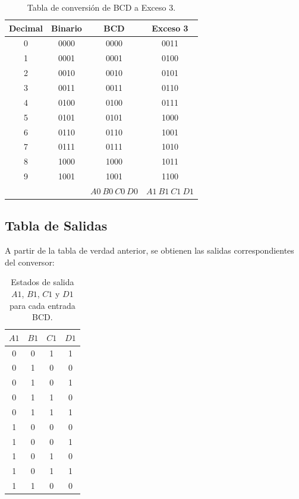 \documentclass[a4paper,12pt]{article}
\begin{document}
	\begin{table}[H]
		\centering
		\begin{tabular}{|c|c|c|c|}
			\hline
			\textbf{Decimal} & \textbf{Binario} & \textbf{BCD} & \textbf{Exceso 3} \\
			\hline
			0 & 0000 & 0000 & 0011 \\
			1 & 0001 & 0001 & 0100 \\
			2 & 0010 & 0010 & 0101 \\
			3 & 0011 & 0011 & 0110 \\
			4 & 0100 & 0100 & 0111 \\
			5 & 0101 & 0101 & 1000 \\
			6 & 0110 & 0110 & 1001 \\
			7 & 0111 & 0111 & 1010 \\
			8 & 1000 & 1000 & 1011 \\
			9 & 1001 & 1001 & 1100 \\
			\hline
			\multicolumn{2}{|c|}{} & $A0\ B0\ C0\ D0$ & $A1\ B1\ C1\ D1$ \\
			\hline
		\end{tabular}
		\caption{Tabla de conversión de BCD a Exceso 3.}
		\label{tab:bcd_exceso3}
	\end{table}
	
	\subsection{Tabla de Salidas}
	
	A partir de la tabla de verdad anterior, se obtienen las salidas correspondientes del conversor:
	
	\begin{table}[h]
		\centering
		\begin{tabular}{|c|c|c|c|}
			\hline
			\textbf{$A1$} & \textbf{$B1$} & \textbf{$C1$} & \textbf{$D1$} \\
			\hline
			0 & 0 & 1 & 1 \\
			0 & 1 & 0 & 0 \\
			0 & 1 & 0 & 1 \\
			0 & 1 & 1 & 0 \\
			0 & 1 & 1 & 1 \\
			1 & 0 & 0 & 0 \\
			1 & 0 & 0 & 1 \\
			1 & 0 & 1 & 0 \\
			1 & 0 & 1 & 1 \\
			1 & 1 & 0 & 0 \\
			\hline
		\end{tabular}
		\caption{Estados de salida $A1$, $B1$, $C1$ y $D1$ para cada entrada BCD.}
		\label{tab:salidas_exceso3}
	\end{table}
	
\end{document}
